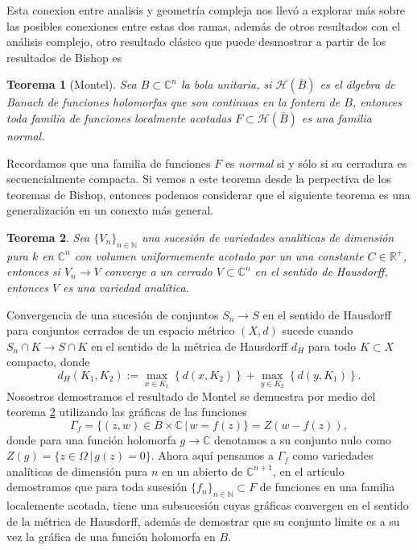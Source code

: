 \documentclass[letterpaper]{report}
\newtheorem{teorema}{Teorema}[chapter]
\newcommand{\nat}{\ensuremath{ \mathbb N }}
\newcommand{\co}{\ensuremath{\mathbb C }}
\newcommand{\con}{\ensuremath{\mathbb{C}^n}}
\newcommand{\re}{\ensuremath{\mathbb R }}
\begin{document}
Esta conexion entre analisis y geometría compleja nos llev\'o a explorar m\'as sobre las posibles conexiones entre estas dos ramas,
adem\'as de otros resultados con el an\'alisis complejo, otro resultado cl\'asico que puede desmostrar a partir de los resultados de Bishop
es
\begin{teorema}[Montel]\label{Montel}
        Sea $B\subset\con$ la bola unitaria, si $\mathcal{H}(\overline{B})$ es el \'algebra de Banach de funciones holomorfas que son continuas 
        en la fontera de $B$, entonces toda familia de funciones localmente acotadas $F\subset\mathcal{H}(\overline{B})$ es una familia \textit{normal}.
\end{teorema}
Recordamos que una familia de funciones $F$ es \textit{normal} si y s\'olo si su cerradura es secuencialmente compacta. Si vemos a este 
teorema desde la perpectiva de los teoremas de Bishop, entonces podemos considerar que el siguiente teorema es una generalizaci\'on en
un conexto m\'as general.
\begin{teorema}\label{Bishop2}
        Sea $\{ V_n \}_{n\in\nat}$ una sucesi\'on de variedades anal\'iticas de dimensi\'on pura $k$ en $\con$ con volumen uniformemente
        acotado por un una constante $C\in\re^{+}$, entonces si $V_n\rightarrow V$ converge a un cerrado $V\subset\con$ en el sentido de Hausdorff, entonces 
        $V$ es una variedad anal\'itica.
\end{teorema}
Convergencia de una sucesi\'on de conjuntos $S_n\rightarrow S$ en el sentido de Hausdorff para conjuntos cerrados de un espacio m\'etrico $(X,d)$
sucede cuando $S_n\cap K\rightarrow S\cap K$ en el sentido de la m\'etrica de Hausdorff $d_H$ para todo $K\subset X$ compacto, donde
\[
        d_H(K_1,K_2):= \max_{x\in K_1}\left\{d(x,K_2)\right\}+\max_{y\in K_2}\left\{d(y,K_1)\right\}. 
\]
Nosostros demostramos el resultado de Montel se demuestra por medio del teorema \ref{Bishop2} utilizando las gr\'aficas de las
funciones 
\[
        \Gamma_{f}=\{(z,w)\in B\times\co\,|\,w=f(z)\}=Z(w-f(z)),
\]
\noindent donde para una funci\'on holomorfa $g\rightarrow\co$ denotamos a su conjunto nulo como $Z(g)=\{z\in\Omega\,|\,g(z)=0\}$. Ahora aqu\'i 
pensamos a $\Gamma_{f}$ como variedades anal\'iticas de dimensi\'on pura $n$ en un abierto de $\co^{n+1}$, en el art\'iculo demostramos 
que para toda susesi\'on $\{f_n\}_{n\in\nat}\subset F$ de funciones en una familia localemente acotada, tiene una subsucesi\'on 
cuyas gr\'aficas convergen en el sentido de la m\'etrica de Hausdorff, adem\'as de demostrar que su conjunto l\'imite 
es a su vez la gr\'afica de una funci\'on holomorfa en $B$.
\end{document}
